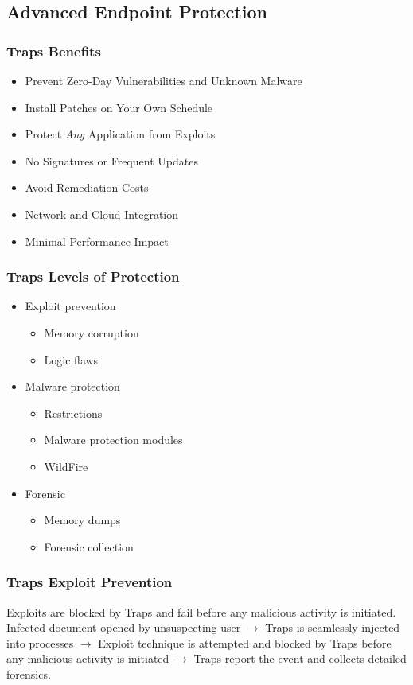 \subsection{Advanced Endpoint Protection}
\subsubsection{Traps Benefits}
\begin{itemize}
    \item Prevent Zero-Day Vulnerabilities and Unknown Malware
    \item Install Patches on Your Own Schedule
    \item Protect \textit{Any} Application from Exploits
    \item No Signatures or Frequent Updates
    \item Avoid Remediation Costs
    \item Network and Cloud Integration
    \item Minimal Performance Impact
\end{itemize}

\subsubsection{Traps Levels of Protection}
\begin{itemize}
    \item Exploit prevention
        \begin{itemize}
            \item Memory corruption
            \item Logic flaws
        \end{itemize}
    \item Malware protection
        \begin{itemize}
            \item Restrictions
            \item Malware protection modules
            \item WildFire
        \end{itemize}
    \item Forensic
        \begin{itemize}
            \item Memory dumps
            \item Forensic collection
        \end{itemize}
\end{itemize}

\subsubsection{Traps Exploit Prevention}
Exploits are blocked by Traps and fail before any malicious activity is initiated.
\newline
Infected document opened by unsuspecting user $\rightarrow$ Traps is seamlessly injected into processes $\rightarrow$ Exploit technique is attempted and blocked by Traps before any malicious activity is initiated $\rightarrow$ Traps report the event and collects detailed forensics.

